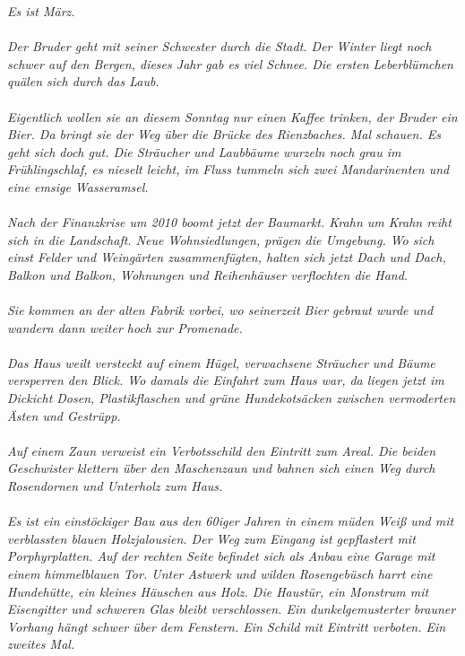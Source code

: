 \textit{Es ist März. \\\\
Der Bruder geht mit seiner Schwester durch die Stadt. Der Winter liegt noch schwer auf den Bergen, dieses Jahr gab es viel Schnee. Die ersten Leberblümchen quälen sich durch das Laub.\\\\
Eigentlich wollen sie an diesem Sonntag nur einen Kaffee trinken, der Bruder ein Bier. Da bringt sie der Weg über die Brücke des Rienzbaches. Mal schauen. Es geht sich doch gut. Die Sträucher und Laubbäume wurzeln noch grau im Frühlingschlaf, es nieselt leicht, im Fluss tummeln sich zwei Mandarinenten und eine emsige Wasseramsel.\\\\
Nach der Finanzkrise um 2010 boomt jetzt der Baumarkt. Krahn um Krahn reiht sich in die Landschaft. Neue Wohnsiedlungen, prägen die Umgebung. Wo sich einst Felder und Weingärten zusammenfügten, halten sich jetzt Dach und Dach, Balkon und Balkon, Wohnungen und Reihenhäuser verflochten die Hand.\\\\
Sie kommen an der alten Fabrik vorbei, wo seinerzeit Bier gebraut wurde und wandern dann weiter hoch zur Promenade. \\\\
Das Haus weilt versteckt auf einem Hügel, verwachsene Sträucher und Bäume versperren den Blick. Wo damals die Einfahrt zum Haus war, da liegen jetzt im Dickicht Dosen, Plastikflaschen und grüne Hundekotsäcken zwischen vermoderten Ästen und Gestrüpp. \\\\
Auf einem Zaun verweist ein Verbotsschild den Eintritt zum Areal. Die beiden Geschwister klettern über den Maschenzaun und bahnen sich einen Weg durch Rosendornen und Unterholz zum Haus. \\\\
Es ist ein einstöckiger Bau aus den 60iger Jahren in einem müden Weiß und mit verblassten blauen Holzjalousien. Der Weg zum Eingang ist gepflastert mit Porphyrplatten. Auf der rechten Seite befindet sich als Anbau eine Garage mit einem himmelblauen Tor. Unter Astwerk und wilden Rosengebüsch harrt eine Hundehütte, ein kleines Häuschen aus Holz. Die Haustür, ein Monstrum mit Eisengitter und schweren Glas bleibt verschlossen. Ein dunkelgemusterter brauner Vorhang hängt schwer über dem Fenstern. Ein Schild mit Eintritt verboten. Ein zweites Mal.\\\\
}
